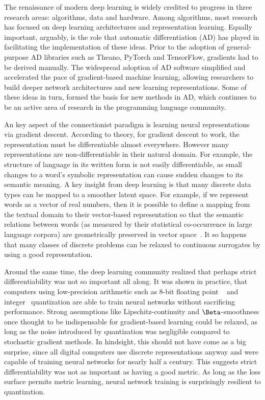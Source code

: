 \documentclass[12pt,initial,twoside,maitrise]{dms}
\numberwithin{equation}{section}
\numberwithin{table}{chapter}
\numberwithin{figure}{chapter}
\begin{document}
The renaissance of modern deep learning is widely credited to progress in three research areas: algorithms, data and hardware. Among algorithms, most research has focused on deep learning architectures and representation learning. Equally important, arguably, is the role that automatic differentiation (AD) has played in facilitating the implementation of these ideas. Prior to the adoption of general-purpose AD libraries such as Theano, PyTorch and TensorFlow, gradients had to be derived manually. The widespread adoption of AD software simplified and accelerated the pace of gradient-based machine learning, allowing researchers to build deeper network architectures and new learning representations. Some of these ideas in turn, formed the basis for new methods in AD, which continues to be an active area of research in the programming language community.

An key aspect of the connectionist paradigm is learning neural representations via gradient descent. According to theory, for gradient descent to work, the representation must be differentiable almost everywhere. However many representations are non-differentiable in their natural domain. For example, the structure of language in its written form is not easily differentiable, as small changes to a word's symbolic representation can cause sudden changes to its semantic meaning. A key insight from deep learning is that many discrete data types can be mapped to a smoother latent space. For example, if we represent words as a vector of real numbers, then it is possible to define a mapping from the textual domain to their vector-based representation so that the semantic relations between words (as measured by their statistical co-occurrence in large language corpora) are geometrically preserved in vector space~\cite{pennington2014glove}. It so happens that many classes of discrete problems can be relaxed to continuous surrogates by using a good representation.

Around the same time, the deep learning community realized that perhaps strict differentiability was not so important all along. It was shown in practice, that computers using low-precision arithmetic such as 8-bit floating point ~\cite{wang2018training} and integer~\cite{jacob2018quantization} quantization are able to train neural networks without sacrificing performance. Strong assumptions like Lipschitz-continuity and $\Beta$-smoothness once thought to be indispensable for gradient-based learning could be relaxed, as long as the noise introduced by quantization was negligible compared to stochastic gradient methods. In hindsight, this should not have come as a big surprise, since all digital computers use discrete representations anyway and were capable of training neural networks for nearly half a century. This suggests strict differentiability was not as important as having a good metric. As long as the loss surface permits metric learning, neural network training is surprisingly resilient to quantization.
\end{document}
